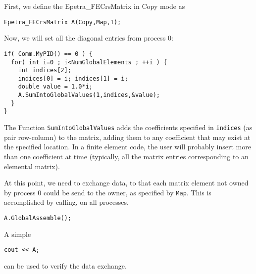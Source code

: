 First, we define the Epetra\_FECrsMatrix in Copy mode as
\begin{verbatim}
Epetra_FECrsMatrix A(Copy,Map,1);
\end{verbatim}
Now, we will set all the diagonal entries from process 0:
\begin{verbatim}
if( Comm.MyPID() == 0 ) {
  for( int i=0 ; i<NumGlobalElements ; ++i ) {
    int indices[2];
    indices[0] = i; indices[1] = i;
    double value = 1.0*i;
    A.SumIntoGlobalValues(1,indices,&value);
  }
}
\end{verbatim}
The Function \verb!SumIntoGlobalValues! adds the coefficients specified
in \verb!indices! (as pair row-column) to the matrix, adding them to any
coefficient that may exist at the specified location. In a finite
element code, the user will probably insert more than one coefficient
at time (typically, all the matrix entries corresponding to an elemental
matrix).

At this point, we need to exchange data, to that each matrix element not
owned by process 0 could be send to the owner, as specified by
\verb!Map!. This is accomplished by calling, on all processes,
\begin{verbatim}
A.GlobalAssemble();
\end{verbatim}
A simple 
\begin{verbatim}
cout << A;
\end{verbatim}
can be used to verify the data exchange.
